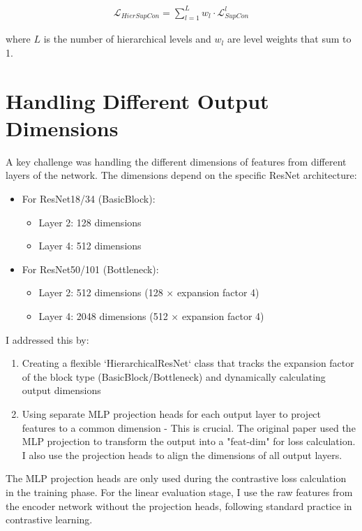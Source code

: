 \documentclass[10pt,a4paper]{article}
\begin{document}
\begin{align}
\mathcal{L}_{HierSupCon} = \sum_{l=1}^{L} w_l \cdot \mathcal{L}_{SupCon}^{l}
\end{align}

where $L$ is the number of hierarchical levels and $w_l$ are level weights that sum to 1. 

\section{Handling Different Output Dimensions}

A key challenge was handling the different dimensions of features from different layers of the network. The dimensions depend on the specific ResNet architecture:

\begin{itemize}
    \item For ResNet18/34 (BasicBlock):
        \begin{itemize}
            \item Layer 2: 128 dimensions
            \item Layer 4: 512 dimensions
        \end{itemize}
    \item For ResNet50/101 (Bottleneck):
        \begin{itemize}
            \item Layer 2: 512 dimensions (128 × expansion factor 4)
            \item Layer 4: 2048 dimensions (512 × expansion factor 4)
        \end{itemize}
\end{itemize}

I addressed this by:
\begin{enumerate}
    \item Creating a flexible `HierarchicalResNet` class that tracks the expansion factor of the block type (BasicBlock/Bottleneck) and dynamically calculating output dimensions
    \item Using separate MLP projection heads for each output layer to project features to a common dimension - This is crucial. The original paper used the MLP projection to transform the output into a "feat-dim" for loss calculation. I also use the projection heads to align the dimensions of all output layers.
\end{enumerate}

The MLP projection heads are only used during the contrastive loss calculation in the training phase. For the linear evaluation stage, I use the raw features from the encoder network without the projection heads, following standard practice in contrastive learning.
\end{document}
